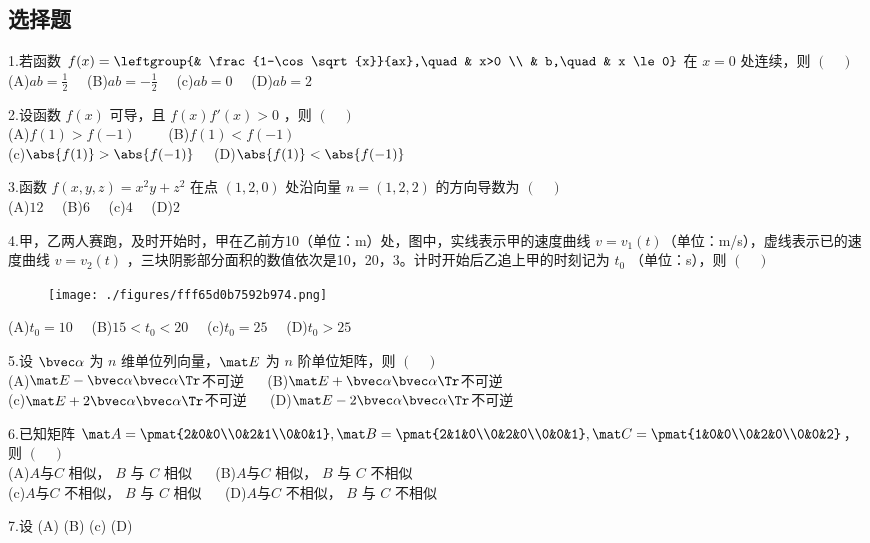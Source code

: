 
\subsection{选择题}
1.若函数 $f(x)=\leftgroup{& \frac{1-\cos \sqrt{x}}{ax},\quad  & x>0 \\ & b,\quad & x \le 0}$ 在 $x=0$ 处连续，则 $(\quad)$\\
(A)$ab=\frac{1}{2} \quad$
(B)$ab=-\frac{1}{2} \quad$
(c)$ab=0 \quad$
(D)$ab=2 \quad$

2.设函数 $f(x)$ 可导，且 $f(x)f'(x)>0$ ，则 $(\quad)$ \\
(A)$f(1)>f(-1) \qquad$
(B)$f(1)<f(-1) \quad$\\
(c)$\abs{f(1)}>\abs{f(-1)} \quad$
(D)$\abs{f(1)}<\abs{f(-1)} $

3.函数 $f(x,y,z)=x^2y+z^2$ 在点 $(1,2,0)$ 处沿向量 $n=(1,2,2)$ 的方向导数为 $(\quad)$\\
(A)$12 \quad$
(B)$6 \quad$
(c)$4 \quad$
(D)$2 \quad$


4.甲，乙两人赛跑，及时开始时，甲在乙前方10（单位：m）处，图中，实线表示甲的速度曲线 $v=v_1(t)$（单位：m/s），虚线表示已的速度曲线 $v=v_2(t)$ ，三块阴影部分面积的数值依次是10，20，3。计时开始后乙追上甲的时刻记为 $t_0$ （单位：s），则 $(\quad)$\\
\begin{figure}[ht]
\centering
\texttt{[image: ./figures/fff65d0b7592b974.png]}
\caption{} \label{fig_PeeM17_1}
\end{figure}
(A)$t_0=10 \quad$
(B)$15<t_0<20 \quad $
(c)$t_0=25\quad$
(D)$t_0>25$

5.设 $\bvec \alpha$ 为 $n$ 维单位列向量，$\mat E$ 为 $n$ 阶单位矩阵，则 $(\quad)$\\
(A)$\mat E- \bvec \alpha \bvec \alpha \Tr$不可逆 $\quad$
(B)$\mat E+ \bvec \alpha \bvec \alpha \Tr$不可逆\\
(c)$\mat E+ 2\bvec \alpha \bvec \alpha \Tr$不可逆 $\quad$
(D)$\mat E- 2\bvec \alpha \bvec \alpha \Tr$不可逆

6.已知矩阵 $\mat A=\pmat{2&0&0\\0&2&1\\0&0&1},\mat B=\pmat{2&1&0\\0&2&0\\0&0&1},\mat C=\pmat{1&0&0\\0&2&0\\0&0&2}$，则 $(\quad)$\\
(A)$A$与$C$ 相似， $B$ 与 $C$ 相似 $\quad$
(B)$A$与$C$ 相似， $B$ 与 $C$ 不相似 \\
(c)$A$与$C$ 不相似， $B$ 与 $C$ 相似 $\quad$
(D)$A$与$C$ 不相似， $B$ 与 $C$ 不相似 $\quad$

7.设
(A)
(B)
(c)
(D)
